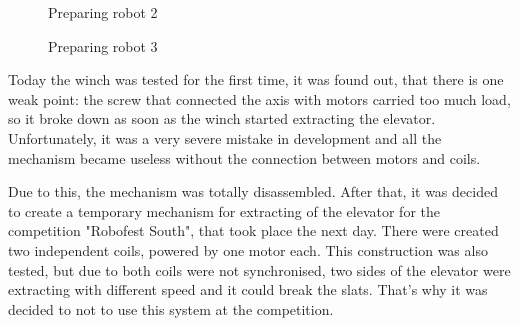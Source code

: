 \begin{figure}[H]
\begin{minipage}[h]{0.31\linewidth}
		\caption{Preparing robot 2}
	\end{minipage}
	\hfill
	\begin{minipage}[h]{0.31\linewidth}
		\caption{Preparing robot 3}
	\end{minipage}
\end{figure}

Today the winch was tested for the first time, it was found out, that there is one weak point: the screw that connected the axis with motors carried too much load, so it broke down as soon as the winch started extracting the elevator. Unfortunately, it was a very severe mistake in development and all the mechanism became useless without the connection between motors and coils.

Due to this, the mechanism was totally disassembled. After that, it was decided to create a temporary mechanism for extracting of the elevator for the competition "Robofest South", that took place the next day. There were created two independent coils, powered by one motor each. This construction was also tested, but due to both coils were not synchronised, two sides of the elevator were extracting with different speed and it could break the slats. That's why it was decided to not to use this system at the competition.